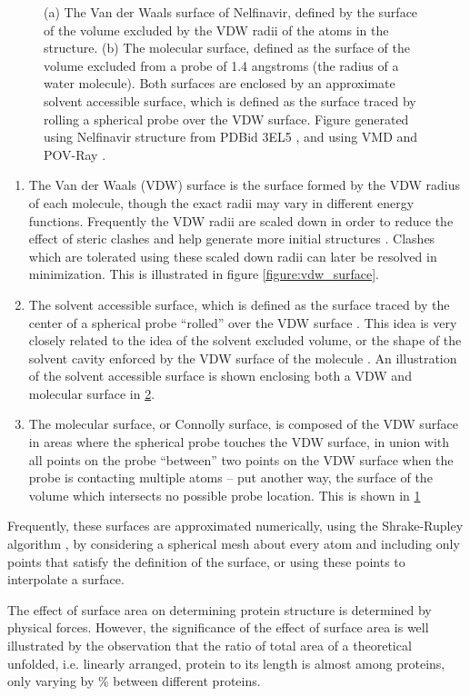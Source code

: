 \begin{figure}[h]
\begin{subfigure}[b]{0.4\textwidth}
\caption{}
\label{figure:molecular_surface}
\end{subfigure}
\caption{(a) The Van der Waals surface of Nelfinavir, defined by the surface of the volume excluded by the VDW radii of the atoms in the structure.
(b) The molecular surface, defined as the surface of the volume excluded from a probe of 1.4 angstroms (the radius of a water molecule).
Both surfaces are enclosed by an approximate solvent accessible surface, which is defined as the surface traced by rolling a spherical probe over the VDW surface.
Figure generated using Nelfinavir structure from PDBid 3EL5 \protect\cite{king2012extreme}, and using VMD and POV-Ray \protect\cite{humphrey1996vmd,povray}.}
\label{figure:surfaces}
\end{figure}
\begin{enumerate}
\item The Van der Waals (VDW) surface is the surface formed by the VDW radius of each molecule, though the exact radii may vary in different energy functions.
Frequently the VDW radii are scaled down in order to reduce the effect of steric clashes and help generate more initial structures \cite{schulz2003binding,halgren2004glide}.
Clashes which are tolerated using these scaled down radii can later be resolved in minimization.
This is illustrated in figure \ref{figure:vdw_surface}.
\item The solvent accessible surface, which is defined as the surface traced by the center of a spherical probe ``rolled'' over the VDW surface \cite{richards1977areas}.
This idea is very closely related to the idea of the solvent excluded volume, or the shape of the solvent cavity enforced by the VDW surface of the molecule \cite{richmond1984solvent}.
An illustration of the solvent accessible surface is shown enclosing both a VDW and molecular surface in \ref{figure:surfaces}.
\item The molecular surface, or Connolly surface, is composed of the VDW surface in areas where the spherical probe touches the VDW surface, in union with all points on the probe ``between'' two points on the VDW surface when the probe is contacting multiple atoms \cite{connolly1983analytical} -- put another way, the surface of the volume which intersects no possible probe location.
This is shown in \ref{figure:molecular_surface}
\end{enumerate}
Frequently, these surfaces are approximated numerically, using the Shrake-Rupley algorithm \cite{shrake1973environment}, by considering a spherical mesh about every atom and including only points that satisfy the definition of the surface, or using these points to interpolate a surface.

The effect of surface area on determining protein structure is determined by physical forces.
However, the significance of the effect of surface area is well illustrated by the observation that the ratio of total area of a theoretical unfolded, i.e. linearly arranged, protein to its length is almost among proteins, only varying by \% between different proteins.
